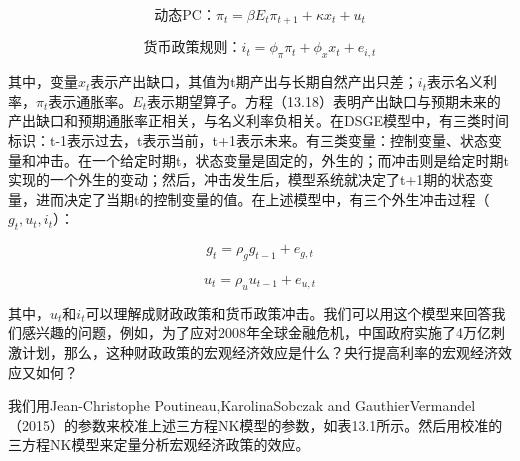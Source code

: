 \documentclass[cn,12pt,math=newtx,citestyle=gb7714-2015,bibstyle=gb7714-2015]{elegantbook}
\begin{document}
	
	\begin{equation}
		\text{动态PC：}\pi_t =\beta E_t \pi_{t+1} + \kappa x_t + u_t
	\end{equation}
	
	\begin{equation}
		\text{货币政策规则：} i_t =\phi_\pi \pi_{t} + \phi_x x_t+ e_{i,t}
	\end{equation}
	
	其中，变量$x_t$表示产出缺口，其值为t期产出与长期自然产出只差；$i_t$表示名义利率，$\pi_t$表示通胀率。$E_t$表示期望算子。方程（13.18）表明产出缺口与预期未来的产出缺口和预期通胀率正相关，与名义利率负相关。在DSGE模型中，有三类时间标识：t-1表示过去，t表示当前，t+1表示未来。有三类变量：控制变量、状态变量和冲击。在一个给定时期t，状态变量是固定的，外生的；而冲击则是给定时期t实现的一个外生的变动；然后，冲击发生后，模型系统就决定了t+1期的状态变量，进而决定了当期t的控制变量的值。在上述模型中，有三个外生冲击过程（$g_t, u_t, i_{t}$）：
	
	\begin{equation}
		g_t = \rho_g g_{t-1} +e_{g,t}
	\end{equation}

	\begin{equation}
	u_t = \rho_u u_{t-1} +e_{u,t}
\end{equation}
	
	其中，$u_t$和$i_t$可以理解成财政政策和货币政策冲击。我们可以用这个模型来回答我们感兴趣的问题，例如，为了应对2008年全球金融危机，中国政府实施了4万亿刺激计划，那么，这种财政政策的宏观经济效应是什么？央行提高利率的宏观经济效应又如何？
	
	我们用Jean-Christophe Poutineau,KarolinaSobczak and GauthierVermandel（2015）的参数来校准上述三方程NK模型的参数，如表13.1所示。然后用校准的三方程NK模型来定量分析宏观经济政策的效应。
\end{document}

